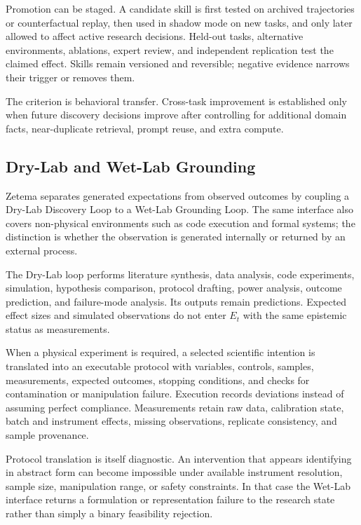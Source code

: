 \documentclass[11pt, a4paper, copyright]{google}
\begin{document}
Promotion can be staged. A candidate skill is first tested on archived trajectories or counterfactual replay, then used in shadow mode on new tasks, and only later allowed to affect active research decisions. Held-out tasks, alternative environments, ablations, expert review, and independent replication test the claimed effect. Skills remain versioned and reversible; negative evidence narrows their trigger or removes them.

The criterion is behavioral transfer. Cross-task improvement is established only when future discovery decisions improve after controlling for additional domain facts, near-duplicate retrieval, prompt reuse, and extra compute.

\subsection{Dry-Lab and Wet-Lab Grounding}
\label{subsec:physical-experiments}

Zetema separates generated expectations from observed outcomes by coupling a Dry-Lab Discovery Loop to a Wet-Lab Grounding Loop. The same interface also covers non-physical environments such as code execution and formal systems; the distinction is whether the observation is generated internally or returned by an external process.

The Dry-Lab loop performs literature synthesis, data analysis, code experiments, simulation, hypothesis comparison, protocol drafting, power analysis, outcome prediction, and failure-mode analysis. Its outputs remain predictions. Expected effect sizes and simulated observations do not enter $E_t$ with the same epistemic status as measurements.

When a physical experiment is required, a selected scientific intention is translated into an executable protocol with variables, controls, samples, measurements, expected outcomes, stopping conditions, and checks for contamination or manipulation failure. Execution records deviations instead of assuming perfect compliance. Measurements retain raw data, calibration state, batch and instrument effects, missing observations, replicate consistency, and sample provenance.

Protocol translation is itself diagnostic. An intervention that appears identifying in abstract form can become impossible under available instrument resolution, sample size, manipulation range, or safety constraints. In that case the Wet-Lab interface returns a formulation or representation failure to the research state rather than simply a binary feasibility rejection.
\end{document}

